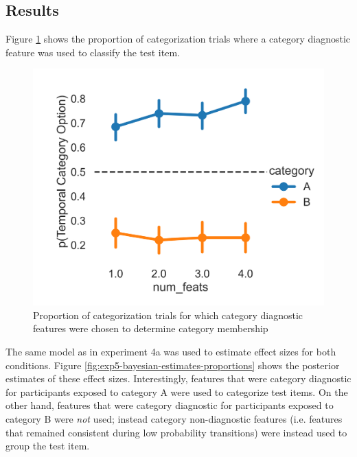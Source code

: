 \subsection{Results}
Figure \ref{fig:exp5-category-proportions} shows the proportion of categorization trials where a category diagnostic feature was used to classify the test item. 
\begin{figure}[h]
    \centering
    \caption{Proportion of categorization trials for which category diagnostic features were chosen to determine category membership}
    \label{fig:exp5-category-proportions}
    \includegraphics[width = \textwidth]{chapter_notebooks/chapter_4/figures/exp5_proportion_results.png}
\end{figure}
The same model as in experiment 4a was used to estimate effect sizes for both conditions. Figure \ref{fig:exp5-bayesian-estimates-proportions} shows the posterior estimates of these effect sizes. Interestingly, features that were category diagnostic for participants exposed to category A were used to categorize test items. On the other hand, features that were category diagnostic for participants exposed to category B were \textit{not} used; instead category non-diagnostic features (i.e. features that remained consistent during low probability transitions) were instead used to group the test item. 

